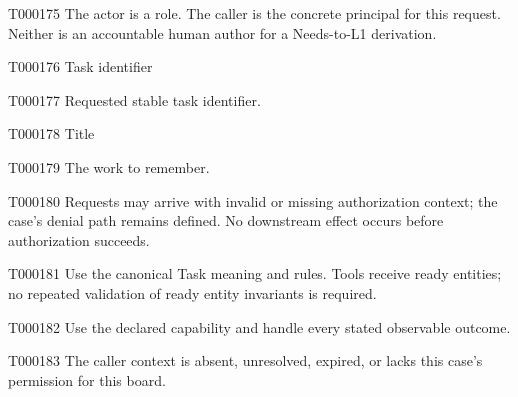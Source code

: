 \documentclass[11pt,a4paper]{article}
\begin{document}
\begin{atlasparagraph}{T000175}
The actor is a role. The caller is the concrete principal for this request. Neither is an accountable human author for a Needs-to-L1 derivation.
\end{atlasparagraph}
\begin{atlastext}{T000176}
Task identifier
\end{atlastext}
\begin{atlasparagraph}{T000177}
Requested stable task identifier.
\end{atlasparagraph}
\begin{atlastext}{T000178}
Title
\end{atlastext}
\begin{atlasparagraph}{T000179}
The work to remember.
\end{atlasparagraph}
\begin{atlasparagraph}{T000180}
Requests may arrive with invalid or missing authorization context; the case's denial path remains defined. No downstream effect occurs before authorization succeeds.
\end{atlasparagraph}
\begin{atlasparagraph}{T000181}
Use the canonical Task meaning and rules. Tools receive ready entities; no repeated validation of ready entity invariants is required.
\end{atlasparagraph}
\begin{atlasparagraph}{T000182}
Use the declared capability and handle every stated observable outcome.
\end{atlasparagraph}
\begin{atlasparagraph}{T000183}
The caller context is absent, unresolved, expired, or lacks this case's permission for this board.
\end{atlasparagraph}
\end{document}
